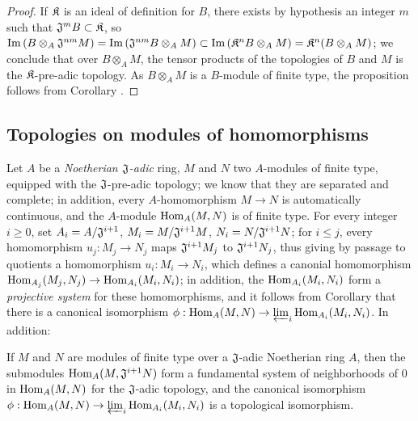\begin{proof}
\label{proof-0.7.7.8}
If $\mathfrak{K}$ is an ideal of definition for $B$, there exists by hypothesis an integer $m$ such
that $\mathfrak{J}^m B\subset\mathfrak{K}$, so
${\mathop{\mathrm{Im}}\nolimits}\,(B\otimes_A\mathfrak{J}^{nm}M)={\mathop{\mathrm{Im}}\nolimits}\,(\mathfrak{J}^{nm}B\otimes_A M)
  \subset{\mathop{\mathrm{Im}}\nolimits}\,(\mathfrak{K}^n B\otimes_A M)=\mathfrak{K}^n(B\otimes_A M)$;
we conclude that over $B\otimes_A M$, the tensor products of the topologies of $B$ and $M$ is the
$\mathfrak{K}$-pre-adic topology. As $B\otimes_A M$ is a $B$-module of finite type, the proposition
follows from Corollary .
\end{proof}

\subsection{Topologies on modules of homomorphisms}
\label{subsection-topologies-on-hom-modules}

\begin{env}[7.8.1]
\label{0.7.8.1}
Let $A$ be a {\em Noetherian $\mathfrak{J}$-adic} ring, $M$ and $N$ two $A$-modules of finite type,
equipped with the $\mathfrak{J}$-pre-adic topology; we know  that they are
separated and complete; in addition, every $A$-homomorphism $M\to N$ is automatically continuous, and
the $A$-module ${\mathop{\mathrm{Hom}}\nolimits}_A(M,N)$ is of finite type. For every integer $i\geqslant 0$, set
$A_i=A/\mathfrak{J}^{i+1}$, $M_i=M/\mathfrak{J}^{i+1}M$, $N_i=N/\mathfrak{J}^{i+1}N$; for
$i\leqslant j$, every homomorphism $u_j:M_j\to N_j$ maps $\mathfrak{J}^{i+1}M_j$ to
$\mathfrak{J}^{i+1}N_j$, thus giving by passage to quotients a homomorphism $u_i:M_i\to N_i$, which
defines a canonial homomorphism ${\mathop{\mathrm{Hom}}\nolimits}_{A_j}(M_j,N_j)\to{\mathop{\mathrm{Hom}}\nolimits}_{A_i}(M_i,N_i)$; in addition, the
${\mathop{\mathrm{Hom}}\nolimits}_{A_i}(M_i,N_i)$ form a {\em projective system} for these homomorphisms, and it follows from
Corollary  that there is a canonical isomorphism
$\phi:{\mathop{\mathrm{Hom}}\nolimits}_A(M,N)\to\varprojlim_i{\mathop{\mathrm{Hom}}\nolimits}_{A_i}(M_i,N_i)$. In addition:
\end{env}

\begin{prop}[7.8.2]
\label{0.7.8.2}
If $M$ and $N$ are modules of finite type over a $\mathfrak{J}$-adic Noetherian ring $A$, then the
submodules ${\mathop{\mathrm{Hom}}\nolimits}_A(M,\mathfrak{J}^{i+1}N)$ form a fundamental system of neighborhoods of $0$ in
${\mathop{\mathrm{Hom}}\nolimits}_A(M,N)$ for the $\mathfrak{J}$-adic topology, and the canonical isomorphism
$\phi:{\mathop{\mathrm{Hom}}\nolimits}_A(M,N)\to\varprojlim_i{\mathop{\mathrm{Hom}}\nolimits}_{A_i}(M_i,N_i)$ is a topological isomorphism.
\end{prop}


